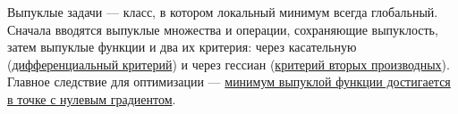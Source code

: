 Выпуклые задачи --- класс, в котором локальный минимум всегда глобальный. Сначала вводятся выпуклые множества и операции, сохраняющие выпуклость, затем выпуклые функции и два их критерия: через касательную (\hyperref[note:18BD8497-CEBD-4962-8144-474B489606C3]{дифференциальный критерий}) и через гессиан (\hyperref[note:86FCE16B-C82E-4416-851C-0E0AD0FDA382]{критерий вторых производных}). Главное следствие для оптимизации --- \hyperref[note:035B8935-65A9-4BB4-BDA3-60A60FF278F0]{минимум выпуклой функции достигается в точке с нулевым градиентом}.
